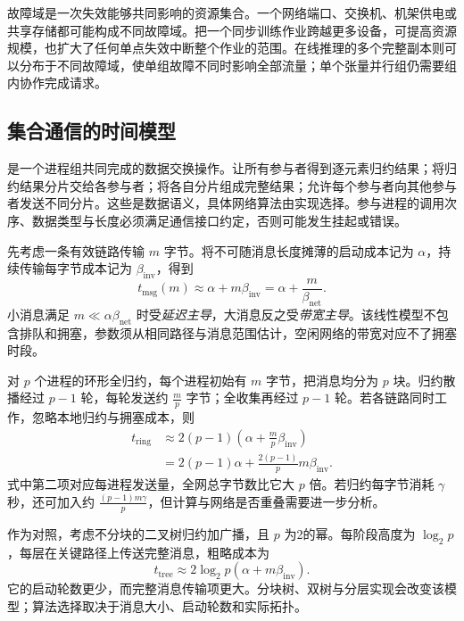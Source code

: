 \documentclass[../textbook.tex]{subfiles}
\begin{document}
故障域是一次失效能够共同影响的资源集合。一个网络端口、交换机、机架供电或共享存储都可能构成不同故障域。把一个同步训练作业跨越更多设备，可提高资源规模，也扩大了任何单点失效中断整个作业的范围。在线推理的多个完整副本则可以分布于不同故障域，使单组故障不同时影响全部流量；单个张量并行组仍需要组内协作完成请求。

\subsection{集合通信的时间模型}
是一个进程组共同完成的数据交换操作。让所有参与者得到逐元素归约结果；将归约结果分片交给各参与者；将各自分片组成完整结果；允许每个参与者向其他参与者发送不同分片。这些是数据语义，具体网络算法由实现选择。参与进程的调用次序、数据类型与长度必须满足通信接口约定，否则可能发生挂起或错误。\cite{nvidia2026ncclcollectives}

先考虑一条有效链路传输 $m$ 字节。将不可随消息长度摊薄的启动成本记为 $\alpha$，持续传输每字节成本记为 $\beta_{\mathrm{inv}}$，得到
\begin{equation}
 t_{\mathrm{msg}}(m)\approx\alpha+m\beta_{\mathrm{inv}}
 =\alpha+\frac{m}{\beta_{\mathrm{net}}}.
 \label{eq:infra-alpha-beta}
\end{equation}
小消息满足 $m\ll\alpha\beta_{\mathrm{net}}$ 时受\emph{延迟主导}，大消息反之受\emph{带宽主导}。该线性模型不包含排队和拥塞，参数须从相同路径与消息范围估计，空闲网络的带宽对应不了拥塞时段。

对 $p$ 个进程的环形全归约，每个进程初始有 $m$ 字节，把消息均分为 $p$ 块。归约散播经过 $p-1$ 轮，每轮发送约 $\frac{m}{p}$ 字节；全收集再经过 $p-1$ 轮。若各链路同时工作，忽略本地归约与拥塞成本，则
\begin{align}
 t_{\mathrm{ring}}
 &\approx 2(p-1)\left(\alpha+\frac{m}{p}\beta_{\mathrm{inv}}\right)\\
 &=2(p-1)\alpha+\frac{2(p-1)}{p}m\beta_{\mathrm{inv}}.
 \label{eq:infra-ring}
\end{align}
式中第二项对应每进程发送量，全网总字节数比它大 $p$ 倍。若归约每字节消耗 $\gamma$ 秒，还可加入约 $\frac{(p-1)m\gamma}{p}$，但计算与网络是否重叠需要进一步分析。

作为对照，考虑不分块的二叉树归约加广播，且 $p$ 为2的幂。每阶段高度为 $\log_2p$，每层在关键路径上传送完整消息，粗略成本为
\begin{equation}
 t_{\mathrm{tree}}\approx2\log_2p(\alpha+m\beta_{\mathrm{inv}}).
\end{equation}
它的启动轮数更少，而完整消息传输项更大。分块树、双树与分层实现会改变该模型；算法选择取决于消息大小、启动轮数和实际拓扑。
\end{document}
